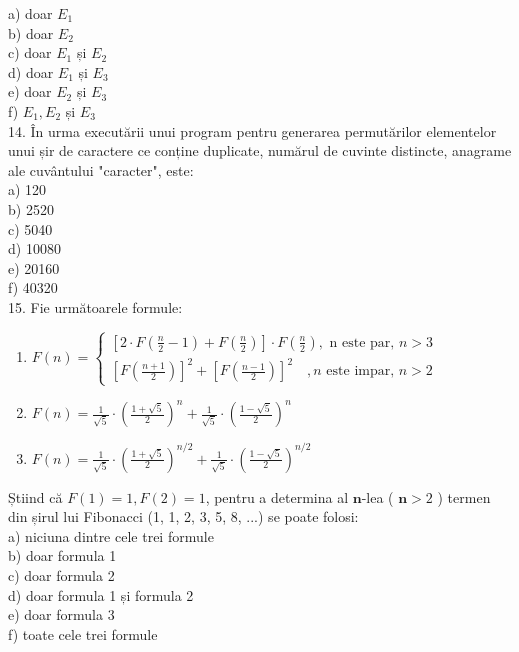 \documentclass[10pt]{article}
\begin{document}
a) doar $E_{1}$\\
b) doar $E_{2}$\\
c) doar $E_{1}$ și $E_{2}$\\
d) doar $E_{1}$ și $E_{3}$\\
e) doar $E_{2}$ și $E_{3}$\\
f) $E_{1}, E_{2}$ și $E_{3}$\\
14. În urma executării unui program pentru generarea permutărilor elementelor unui șir de caractere ce conține duplicate, numărul de cuvinte distincte, anagrame ale cuvântului "caracter", este:\\
a) 120\\
b) 2520\\
c) 5040\\
d) 10080\\
e) 20160\\
f) 40320\\
15. Fie următoarele formule:

\begin{enumerate}
  \item $F(n)=\left\{\begin{array}{l}{\left[2 \cdot F\left(\frac{n}{2}-1\right)+F\left(\frac{n}{2}\right)\right] \cdot F\left(\frac{n}{2}\right), \text { n este par, } n>3} \\ {\left[F\left(\frac{n+1}{2}\right)\right]^{2}+\left[F\left(\frac{n-1}{2}\right)\right]^{2} \quad, n \text { este impar, } n>2}\end{array}\right.$
  \item $F(n)=\frac{1}{\sqrt{5}} \cdot\left(\frac{1+\sqrt{5}}{2}\right)^{n}+\frac{1}{\sqrt{5}} \cdot\left(\frac{1-\sqrt{5}}{2}\right)^{n}$
  \item $F(n)=\frac{1}{\sqrt{5}} \cdot\left(\frac{1+\sqrt{5}}{2}\right)^{n / 2}+\frac{1}{\sqrt{5}} \cdot\left(\frac{1-\sqrt{5}}{2}\right)^{n / 2}$
\end{enumerate}

Știind că $F(1)=1, F(2)=1$, pentru a determina al $\mathbf{n}$-lea ( $\mathbf{n}>2$ ) termen din șirul lui Fibonacci (1, 1, 2, 3, 5, 8, ...) se poate folosi:\\
a) niciuna dintre cele trei formule\\
b) doar formula 1\\
c) doar formula 2\\
d) doar formula 1 și formula 2\\
e) doar formula 3\\
f) toate cele trei formule
\end{document}
